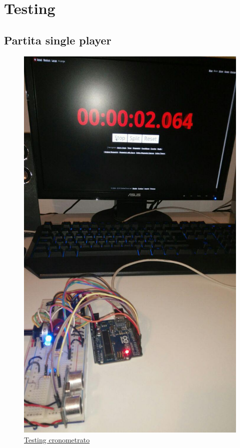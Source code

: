 \chapter{Testing}

\section{Partita single player}
\begin{figure}[!ht]
	\centering
	\includegraphics[scale=.25]{img/testing/testing1.jpg}
	\caption{\href{https://youtu.be/X0QOKkfVF4Y}{Testing cronometrato}}
\end{figure}

